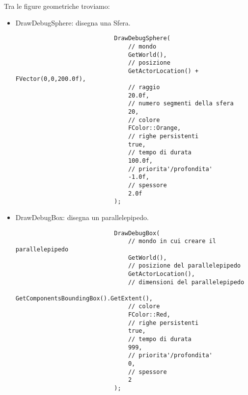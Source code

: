             Tra le figure geometriche troviamo:
            \begin{itemize}
                \item DrawDebugSphere: disegna una Sfera.

                    \begin{examplebox}
                        \begin{verbatim}
                            DrawDebugSphere(
                                // mondo
                                GetWorld(),
                                // posizione
                                GetActorLocation() + FVector(0,0,200.0f),
                                // raggio
                                20.0f,
                                // numero segmenti della sfera
                                20,
                                // colore
                                FColor::Orange,
                                // righe persistenti
                                true,
                                // tempo di durata
                                100.0f,
                                // priorita'/profondita'
                                -1.0f,
                                // spessore
                                2.0f
                            );
                        \end{verbatim}
                    \end{examplebox}

                \item DrawDebugBox: disegna un parallelepipedo.

                    \begin{examplebox}
                        \begin{verbatim}
                            DrawDebugBox(
                                // mondo in cui creare il parallelepipedo
                                GetWorld(),
                                // posizione del parallelepipedo
                                GetActorLocation(),
                                // dimensioni del parallelepipedo
                                GetComponentsBoundingBox().GetExtent(),
                                // colore
                                FColor::Red,
                                // righe persistenti
                                true,
                                // tempo di durata
                                999,
                                // priorita'/profondita'
                                0,
                                // spessore
                                2
                            );
                        \end{verbatim}
                    \end{examplebox}

            \end{itemize}


